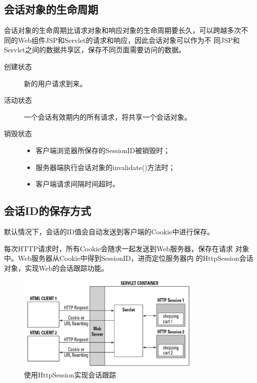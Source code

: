 \subsection{会话对象的生命周期} 

会话对象的生命周期比请求对象和响应对象的生命周期要长久，可以跨越多次不
同的Web组件JSP和Servlet的请求和响应，因此会话对象可以作为不
同JSP和Servlet之间的数据共享区，保存不同页面需要访问的数据。

\begin{description}
\item[创建状态] 新的用户请求到来。
\item[活动状态] 一个会话有效期内的所有请求，将共享一个会话对象。
\item[销毁状态]
  \begin{itemize}\kai
  \item 客户端浏览器所保存的SessionID被销毁时；
  \item 服务器端执行会话对象的invalidate()方法时；
  \item 客户端请求间隔时间超时。
  \end{itemize}
\end{description}

\subsection{会话ID的保存方式} 

默认情况下，会话的ID值会{\Red\hei 自动发送到客户端的Cookie中进行保存}。

{\kai 每次HTTP请求时，所有Cookie会随求一起发送到Web服务器，保存在请求
  对象中。Web服务器从Cookie中得到SessionID，进而定位服务器内
  的HttpSession会话对象，实现Web的会话跟踪功能。}


\begin{figure}[htb]
\centering
\includegraphics[width=0.8\textwidth]{images/JavaEE-HTTP-session/fig-http-session.png}
\caption{使用HttpSession实现会话跟踪}
\label{fig:http-session}
\end{figure}

